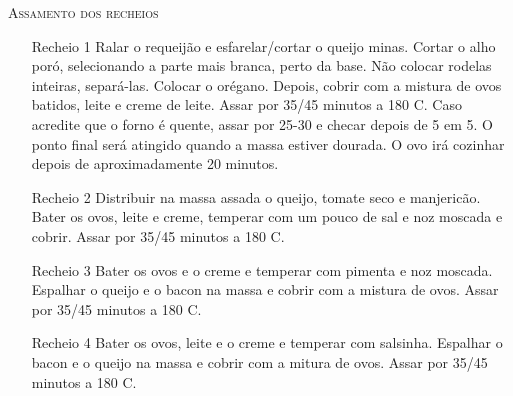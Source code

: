{	\textsc{Assamento dos recheios}

	\begin{itemize}
		\item[Recheio 1] Ralar o requeijão e esfarelar/cortar o queijo minas. Cortar o
		      alho poró, selecionando a parte mais branca, perto da base. Não colocar
		      rodelas inteiras, separá-las. Colocar o orégano. Depois, cobrir com a
		      mistura de ovos batidos, leite e creme de leite. Assar por 35/45 minutos a
		      180\grau{} C. Caso acredite que o forno é quente, assar por 25-30 e
		      checar depois de 5 em 5. O ponto final será atingido quando a massa
		      estiver dourada. O ovo irá cozinhar depois de aproximadamente 20 minutos.
		\item[Recheio 2] Distribuir na massa assada o queijo, tomate seco e
		      manjericão. Bater os ovos, leite e creme, temperar com um pouco de sal e noz
		      moscada e cobrir. Assar por 35/45 minutos a 180\grau{} C.
		\item[Recheio 3] Bater os ovos e o creme e temperar com pimenta e noz moscada.
		      Espalhar o queijo e o bacon na massa e cobrir com a mistura de ovos. Assar
		      por 35/45 minutos a 180\grau{} C.
		\item[Recheio 4] Bater os ovos, leite e o creme e temperar com salsinha.
		      Espalhar o bacon e o queijo na massa e cobrir com a mitura de ovos. Assar
		      por 35/45 minutos a 180\grau{} C.
	\end{itemize}

}

